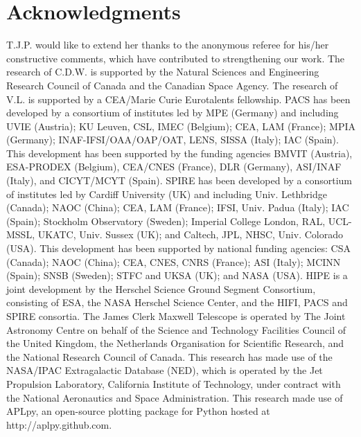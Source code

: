 \section*{Acknowledgments}
T.J.P. would like to extend her thanks to the anonymous referee for his/her constructive comments, which have contributed to strengthening our work.  The research of C.D.W. is supported by the Natural Sciences and Engineering Research Council of Canada and the Canadian Space Agency.  The research of V.L. is supported by a CEA/Marie Curie Eurotalents fellowship.  PACS has been developed by a consortium of institutes led by MPE (Germany) and including UVIE (Austria); KU Leuven, CSL, IMEC (Belgium); CEA, LAM (France); MPIA (Germany); INAF-IFSI/OAA/OAP/OAT, LENS, SISSA (Italy); IAC (Spain). This development has been supported by the funding agencies BMVIT (Austria), ESA-PRODEX (Belgium), CEA/CNES (France), DLR (Germany), ASI/INAF (Italy), and CICYT/MCYT (Spain).  SPIRE has been developed by a consortium of institutes led by Cardiff University (UK) and including Univ. Lethbridge (Canada); NAOC (China); CEA, LAM (France); IFSI, Univ. Padua (Italy); IAC (Spain); Stockholm Observatory (Sweden); Imperial College London, RAL, UCL-MSSL, UKATC, Univ. Sussex (UK); and Caltech, JPL, NHSC, Univ. Colorado (USA). This development has been supported by national funding agencies: CSA (Canada); NAOC (China); CEA, CNES, CNRS (France); ASI (Italy); MCINN (Spain); SNSB (Sweden); STFC and UKSA (UK); and NASA (USA).  HIPE is a joint development by the Herschel Science Ground Segment Consortium, consisting of ESA, the NASA Herschel Science Center, and the HIFI, PACS and SPIRE consortia.  The James Clerk Maxwell Telescope is operated by The Joint Astronomy Centre on behalf of the Science and Technology Facilities Council of the United Kingdom, the Netherlands Organisation for Scientific Research, and the National Research Council of Canada. This research has made use of the NASA/IPAC Extragalactic Database (NED), which is operated by the Jet Propulsion Laboratory, California Institute of Technology, under contract with the National Aeronautics and Space Administration.  This research made use of APLpy, an open-source plotting package for Python hosted at http://aplpy.github.com.

